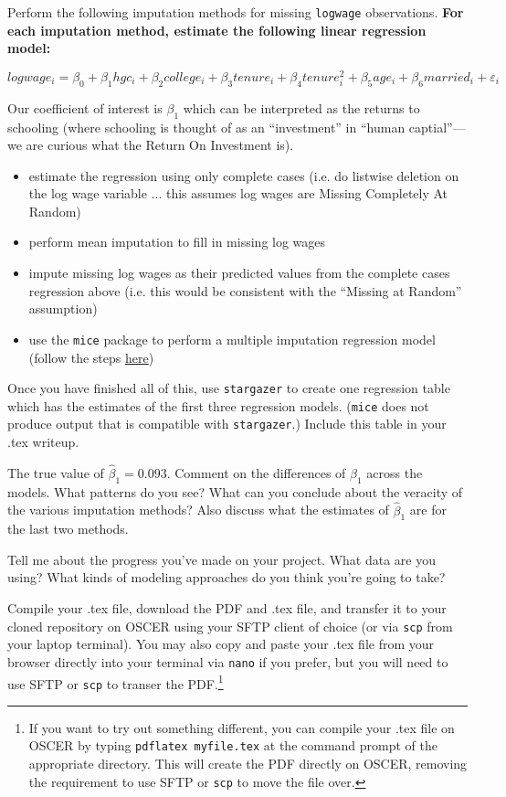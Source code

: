 \documentclass[12pt,english]{exam}
\begin{document}
\begin{questions}
\question Perform the following imputation methods for missing \texttt{logwage} observations. \textbf{For each imputation method, estimate the following linear regression model:}

\[
    logwage_{i} = \beta_{0} +  \beta_{1}hgc_{i} + \beta_{2}college_{i} + \beta_{3}tenure_{i} + \beta_{4}tenure^{2}_{i} + \beta_{5}age_{i} + \beta_{6}married_{i} + \varepsilon_{i}
\]

Our coefficient of interest is $\beta_{1}$ which can be interpreted as the returns to schooling (where schooling is thought of as an ``investment'' in ``human captial''---we are curious what the Return On Investment is).

\begin{itemize}
    \item estimate the regression using only complete cases (i.e. do listwise deletion on the log wage variable ... this assumes log wages are Missing Completely At Random)
    \item perform mean imputation to fill in missing log wages
    \item impute missing log wages as their predicted values from the complete cases regression above (i.e. this would be consistent with the ``Missing at Random'' assumption)
    \item use the \texttt{mice} package to perform a multiple imputation regression model (follow the steps \href{https://rpubs.com/mhanauer/mice}{here})
\end{itemize}

Once you have finished all of this, use \texttt{stargazer} to create one regression table which has the estimates of the first three regression models. (\texttt{mice} does not produce output that is compatible with \texttt{stargazer}.) Include this table in your .tex writeup. 

The true value of $\hat{\beta}_{1}=0.093$. Comment on the differences of $\hat{\beta}_{1}$ across the models. What patterns do you see? What can you conclude about the veracity of the various imputation methods? Also discuss what the estimates of $\hat{\beta}_{1}$ are for the last two methods.

\question Tell me about the progress you've made on your project. What data are you using? What kinds of modeling approaches do you think you're going to take?  

\question Compile your .tex file, download the PDF and .tex file, and transfer it to your cloned repository on OSCER using your SFTP client of choice (or via \texttt{scp} from your laptop terminal). You may also copy and paste your .tex file from your browser directly into your terminal via \texttt{nano} if you prefer, but you will need to use SFTP or \texttt{scp} to transer the PDF.\footnote{If you want to try out something different, you can compile your .tex file on OSCER by typing \texttt{pdflatex myfile.tex} at the command prompt of the appropriate directory. This will create the PDF directly on OSCER, removing the requirement to use SFTP or \texttt{scp} to move the file over.}


\end{questions}
\end{document}

